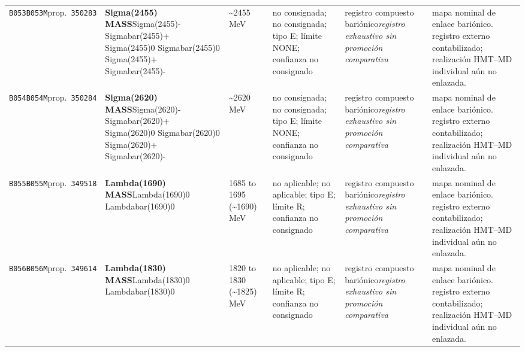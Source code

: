 \begin{landscape}
\begin{longtable}{L{1.85cm}L{4.45cm}L{2.35cm}L{4.05cm}L{3.35cm}L{7.15cm}}
\texttt{B053}\newline \texttt{B053M}\newline prop.\ \texttt{350283} & \textbf{Sigma(2455) MASS}\newline Sigma(2455)- \textbar{}\allowbreak{} Sigmabar(2455)+ \textbar{}\allowbreak{} Sigma(2455)0 \textbar{}\allowbreak{} Sigmabar(2455)0 \textbar{}\allowbreak{} Sigma(2455)+ \textbar{}\allowbreak{} Sigmabar(2455)- & \textasciitilde{}2455\,MeV & no consignada; no consignada; tipo E; límite NONE; confianza no consignado & registro compuesto bariónico\newline \emph{registro exhaustivo sin promoción comparativa} & mapa nominal de enlace bariónico. registro externo contabilizado; realización HMT--MD individual aún no enlazada. \\
\texttt{B054}\newline \texttt{B054M}\newline prop.\ \texttt{350284} & \textbf{Sigma(2620) MASS}\newline Sigma(2620)- \textbar{}\allowbreak{} Sigmabar(2620)+ \textbar{}\allowbreak{} Sigma(2620)0 \textbar{}\allowbreak{} Sigmabar(2620)0 \textbar{}\allowbreak{} Sigma(2620)+ \textbar{}\allowbreak{} Sigmabar(2620)- & \textasciitilde{}2620\,MeV & no consignada; no consignada; tipo E; límite NONE; confianza no consignado & registro compuesto bariónico\newline \emph{registro exhaustivo sin promoción comparativa} & mapa nominal de enlace bariónico. registro externo contabilizado; realización HMT--MD individual aún no enlazada. \\
\texttt{B055}\newline \texttt{B055M}\newline prop.\ \texttt{349518} & \textbf{Lambda(1690) MASS}\newline Lambda(1690)0 \textbar{}\allowbreak{} Lambdabar(1690)0 & 1685 to 1695 (\textasciitilde{}1690)\,MeV & no aplicable; no aplicable; tipo E; límite R; confianza no consignado & registro compuesto bariónico\newline \emph{registro exhaustivo sin promoción comparativa} & mapa nominal de enlace bariónico. registro externo contabilizado; realización HMT--MD individual aún no enlazada. \\
\texttt{B056}\newline \texttt{B056M}\newline prop.\ \texttt{349614} & \textbf{Lambda(1830) MASS}\newline Lambda(1830)0 \textbar{}\allowbreak{} Lambdabar(1830)0 & 1820 to 1830 (\textasciitilde{}1825)\,MeV & no aplicable; no aplicable; tipo E; límite R; confianza no consignado & registro compuesto bariónico\newline \emph{registro exhaustivo sin promoción comparativa} & mapa nominal de enlace bariónico. registro externo contabilizado; realización HMT--MD individual aún no enlazada. \\

\end{longtable}
\end{landscape}
